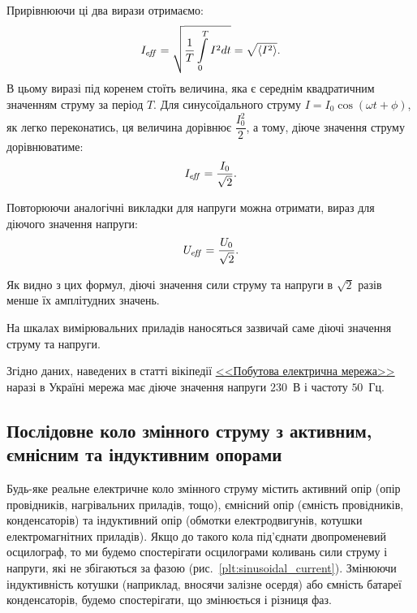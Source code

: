 \documentclass[]{LabWork}
\def\eff{e\kern-.3ex f\kern-.5ex f}
\begin{document}
Прирівнюючи ці два вирази отримаємо:
\[
	I_{\eff} = \sqrt{\frac1T\int\limits_0^T I^2 dt} = \sqrt{\left\langle I^2\right\rangle }.
\]
В цьому виразі під коренем стоїть величина, яка є середнім квадратичним значенням струму за період $T$. Для синусоїдального струму $I = I_0\cos(\omega t + \phi)$, як легко переконатись, ця величина дорівнює $\dfrac{I_0^2}{2}$, а тому, діюче значення струму дорівнюватиме:
\begin{equation}\label{Ieff}
	I_{\eff} = \frac{I_0}{\sqrt2}.
\end{equation}

Повторюючи аналогічні викладки для напруги можна отримати, вираз для діючого значення напруги:
\begin{equation}\label{Ueff}
	U_{\eff} = \frac{U_0}{\sqrt2}.
\end{equation}

Як видно з цих формул, діючі значення сили струму та напруги в $\sqrt2$ разів менше їх амплітудних значень.

\noindent\bigskip%
\begin{More}

	На шкалах вимірювальних приладів наносяться зазвичай саме діючі значення струму та напруги.

	Згідно даних, наведених в статті вікіпедії \href{https://uk.wikipedia.org/wiki/Побутова_електрична_мережа}{<<Побутова електрична мережа>>} наразі в Україні мережа має діюче значення напруги $230$~В  і частоту $50$~Гц.
\end{More}

\subsection{Послідовне коло змінного струму з активним, ємнісним та індуктивним опорами}

Будь-яке реальне електричне коло змінного струму містить активний опір (опір провідників, нагрівальних приладів, тощо), ємнісний опір (ємність провідників, конденсаторів) та індуктивний опір (обмотки електродвигунів, котушки електромагнітних приладів). Якщо до такого кола під’єднати двопроменевий осцилограф, то ми будемо спостерігати осцилограми коливань сили струму і напруги, які не збігаються за фазою (рис.~\ref{plt:sinusoidal_current}). Змінюючи індуктивність котушки (наприклад, вносячи залізне осердя) або ємність батареї конденсаторів, будемо спостерігати, що змінюється і різниця фаз.
\end{document}
